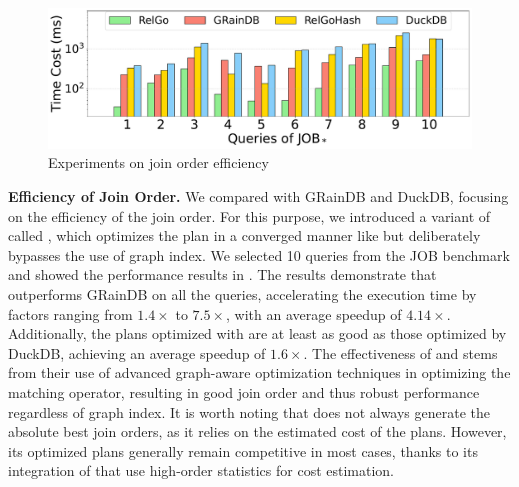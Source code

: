 \begin{figure}[t]
    \centering
    \includegraphics[width=.9\linewidth]{./figures/exp/hash_plan_job.pdf}
    \vspace{-0.5em}
    \caption{Experiments on join order efficiency}
    \label{fig:exp-hash-plan}
    \vspace{-1.2em}
\end{figure}

\noindent\textbf{Efficiency of Join Order.}
We compared \name with GRainDB and DuckDB, focusing on the efficiency of the join order. For this purpose, we introduced a variant of \name called \relgohash, which optimizes the plan in a converged manner like \name but deliberately bypasses the use of graph index. We selected 10 queries from the JOB benchmark and showed the performance results in .
The results demonstrate that \name outperforms GRainDB on all the queries, accelerating the execution time by factors ranging from $1.4\times$ to $7.5\times$, with an average speedup of $4.14\times$. Additionally, the plans optimized with \relgohash are at least as good as those optimized by DuckDB, achieving an average speedup of $1.6\times$. The effectiveness of \name and \relgohash stems from their use of advanced graph-aware optimization techniques in optimizing the matching operator, resulting in good join order and thus robust performance regardless of graph index.
It is worth noting that \name does not always generate the absolute best join orders, as it relies on the estimated cost of the plans. However, its optimized plans generally remain competitive in most cases, thanks to its integration of \glogue that use high-order statistics for cost estimation.




